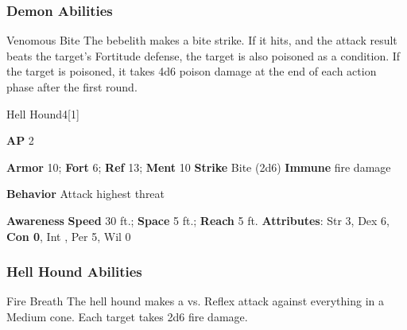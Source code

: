 \subsubsection{Demon Abilities}

\begin{ability}{Venomous Bite}
The bebelith makes a bite strike.
If it hits, and the attack result beats the target's Fortitude defense, the target is also poisoned as a condition.
If the target is poisoned, it takes 4d6 poison damage at the end of each action phase after the first round.
\end{ability}

\begin{monsection}{Hell Hound}{4}[1]
\vspace{-1em}\vspace{-1em}
\begin{spellcontent}
\begin{spelltargetinginfo}
{\textbf{AP} 2}

\pari \textbf{Armor} 10;
\textbf{Fort} 6;
\textbf{Ref} 13;
\textbf{Ment} 10
\pari \textbf{Strike} Bite  (2d6)
\pari \textbf{Immune} fire damage


\pari \textbf{Behavior} Attack highest threat
\end{spelltargetinginfo}
\end{spellcontent}

\begin{monsterfooter}
\pari \textbf{Awareness} 
\pari \textbf{Speed} 30 ft.;
\textbf{Space} 5 ft.;
\textbf{Reach} 5 ft.
\pari \textbf{Attributes}:
Str 3,
Dex 6,
\textbf{Con 0},
Int ,
Per 5,
Wil 0
\end{monsterfooter}
\end{monsection}


\subsubsection{Hell Hound Abilities}

\begin{ability}{Fire Breath}
The hell hound makes a  vs. Reflex attack against everything in a Medium cone.
\hit Each target takes 2d6 fire damage.
\end{ability}

